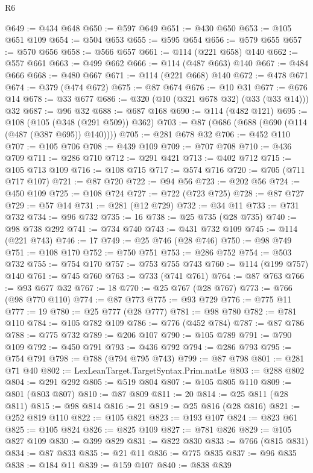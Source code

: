 \begin{lexlean}{R6}
\begin{coremodule}
{{{{{{{{{{{{{{{{{{{{{{{{{{{{{{{{{{{{{{{{{{{{{{{{{{{{{{{{{{{{{@649 := @434 @648
@650 := @597 @649
@651 := @430 @650
@653 := @105 @651 @109
@654 := @504 @653
@655 := @595 @654
@656 := @579 @655
@657 := @570 @656
@658 := @566 @657
@661 := @114 (@221 @658) @140
@662 := @557 @661
@663 := @499 @662
@666 := @114 (@487 @663) @140
@667 := @484 @666
@668 := @480 @667
@671 := @114 (@221 @668) @140
@672 := @478 @671
@674 := @379 (@474 @672)
@675 := @87 @674
@676 := @10 @31
@677 := @676 @14
@678 := @33 @677
@686 := @320 (@10 (@321 @678 @32) (@33 (@33 @14))) @32
@687 := @96 @32
@688 := @687 @168
@690 := @114 (@482 @121)
@695 := @108 (@105 (@348 (@291 @509)) @362)
@703 := @87 (@686 (@688 (@690 (@114 (@487 (@387 @695)) @140))))
@705 := @281 @678 @32
@706 := @452 @110
@707 := @105 @706
@708 := @439 @109
@709 := @707 @708
@710 := @436 @709
@711 := @286 @710
@712 := @291 @421
@713 := @402 @712
@715 := @105 @713 @109
@716 := @108 @715
@717 := @574 @716
@720 := @705 (@711 @717 @107)
@721 := @87 @720
@722 := @94 @56
@723 := @202 @56
@724 := @450 @109
@725 := @108 @724
@727 := @722 (@723 @725)
@728 := @87 @727
@729 := @57 @14
@731 := @281 (@12 @729)
@732 := @34 @11
@733 := @731 @732
@734 := @96 @732
@735 := 16
@738 := @25 @735 (@28 @735)
@740 := @98 @738 @292
@741 := @734 @740
@743 := @431 @732 @109
@745 := @114 (@221 @743)
@746 := 17
@749 := @25 @746 (@28 @746)
@750 := @98 @749
@751 := @108 @170
@752 := @750 @751
@753 := @286 @752
@754 := @503 @732
@755 := @754 @170
@757 := @753 @755 @743
@760 := @114 (@199 @757) @140
@761 := @745 @760
@763 := @733 (@741 @761)
@764 := @87 @763
@766 := @93 @677 @32
@767 := 18
@770 := @25 @767 (@28 @767)
@773 := @766 (@98 @770 @110)
@774 := @87 @773
@775 := @93 @729
@776 := @775 @11
@777 := 19
@780 := @25 @777 (@28 @777)
@781 := @98 @780
@782 := @781 @110
@784 := @105 @782 @109
@786 := @776 (@452 @784)
@787 := @87 @786
@788 := @775 @732
@789 := @206 @107
@790 := @105 @789
@791 := @790 @109
@792 := @450 @791
@793 := @436 @792
@794 := @286 @793
@795 := @754 @791
@798 := @788 (@794 @795 @743)
@799 := @87 @798
@801 := @281 @71 @40
@802 := LexLeanTarget.TargetSyntax.Prim.natLe
@803 := @288 @802
@804 := @291 @292
@805 := @519 @804
@807 := @105 @805 @110
@809 := @801 (@803 @807)
@810 := @87 @809
@811 := 20
@814 := @25 @811 (@28 @811)
@815 := @98 @814
@816 := 21
@819 := @25 @816 (@28 @816)
@821 := @252 @819 @110
@822 := @105 @821
@823 := @193 @107
@824 := @823 @61
@825 := @105 @824
@826 := @825 @109
@827 := @781 @826
@829 := @105 @827 @109
@830 := @399 @829
@831 := @822 @830
@833 := @766 (@815 @831)
@834 := @87 @833
@835 := @21 @11
@836 := @775 @835
@837 := @96 @835
@838 := @184 @11
@839 := @159 @107
@840 := @838 @839
}}}}}}}}}}}}}}}}}}}}}}}}}}}}}}}}}}}}}}}}}}}}}}}}}}}}}}}}}}}}}
\end{coremodule}
\end{lexlean}
